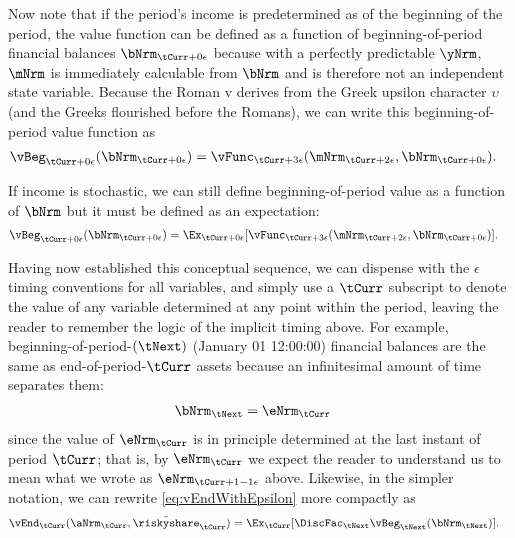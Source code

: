 \documentclass[./SolvingMicroDSOPs]{subfiles}
\begin{document}
Now note that if the period's income is predetermined as of the beginning of the period, the value function can be defined as a function of beginning-of-period financial balances $\bNrm_{\tCurr+\beginWithb}$ because with a perfectly predictable $\yNrm$, $\mNrm$ is immediately calculable from $\bNrm$ and is therefore not an independent state variable.  Because the Roman $\mathrm{v}$ derives from the Greek upsilon character $\upsilon$ (and the Greeks flourished before the Romans), we can write this beginning-of-period value function as
  \begin{align}
    \vBeg_{\tCurr+\beginWithb}(\bNrm_{\tCurr+\beginWithb}) & = \vFunc_{\tCurr+\choosecons}(\mNrm_{\tCurr+\calculatem},\bNrm_{\tCurr+\beginWithb}).
  \end{align}

  If income is stochastic, we can still define beginning-of-period value as a function of $\bNrm$ but it must be defined as an expectation:
  \begin{align}
    \vBeg_{\tCurr+\beginWithb}(\bNrm_{\tCurr+\beginWithb}) & = \Ex_{\tCurr+\beginWithb}[\vFunc_{\tCurr+\choosecons}(\mNrm_{\tCurr+\calculatem},\bNrm_{\tCurr+\beginWithb})].
  \end{align}

Having now established this conceptual sequence, we can dispense with the $\epsilon$ timing conventions for all variables, and simply use a $\tCurr$ subscript to denote the value of any variable determined at any point within the period, leaving the reader to remember the logic of the implicit timing above.  For example, beginning-of-period-$(\tNext)$ (January 01 12:00:00) financial balances are the same as end-of-period-$\tCurr$ assets because an infinitesimal amount of time separates them:
\begin{align}
 \bNrm_{\tNext} & = \eNrm_{\tCurr}
\end{align}
since the value of $\eNrm_{\tCurr}$ is in principle determined at the last instant of period $\tCurr$; that is, by $\eNrm_{\tCurr}$ we expect the reader to understand us to mean what we wrote as $\eNrm_{\tCurr+1-\calculatee}$ above.  Likewise, in the simpler notation, we can rewrite \eqref{eq:vEndWithEpsilon} more compactly as
\begin{align}
  \vEnd_{\tCurr}(\aNrm_{\tCurr},\Rend{\riskyshare}_{\tCurr}) & =  \Ex_{\tCurr}[\DiscFac_{\tNext} \vBeg_{\tNext}(\bNrm_{\tNext})] \label{eq:vEnd}.
\end{align}
\end{document}
